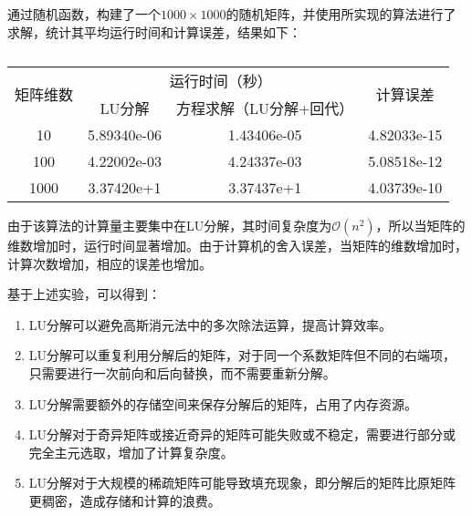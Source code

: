 \documentclass[12pt, onecolumn]{article}
\newcommand\normf{\fangsong}
\begin{document}
	\subsubsection{\normf{大型随机矩阵测试}}
	通过随机函数，构建了一个$1000\times 1000$的随机矩阵，并使用所实现的算法进行了求解，统计其平均运行时间和计算误差，结果如下：
	\begin{table}[h]
	\normf
	\centering
	\caption{\normf{测试结果}}
	\vspace{2mm}
	\begin{tabular}{c|ccc}
	\toprule
	\multirow{2}{*}{矩阵维数} & \multicolumn{2}{c}{运行时间（秒）} & \multirow{2}{*}{计算误差} \\ \cmidrule{2-3}
	                      & LU分解        & 方程求解（LU分解+回代） &                       \\ \midrule
	10                    & 5.89340e-06 & 1.43406e-05   & 4.82033e-15           \\
	100                   & 4.22002e-03 & 4.24337e-03   & 5.08518e-12           \\
	1000                  & 3.37420e+1  & 3.37437e+1    & 4.03739e-10           \\ \bottomrule
	\end{tabular}
	\end{table}
	
	由于该算法的计算量主要集中在LU分解，其时间复杂度为$\mathcal{O}(n^2)$，所以当矩阵的维数增加时，运行时间显著增加。由于计算机的舍入误差，当矩阵的维数增加时，计算次数增加，相应的误差也增加。
	
	基于上述实验，可以得到：
	\begin{enumerate}
	\item LU分解可以避免高斯消元法中的多次除法运算，提高计算效率。
	
	\item LU分解可以重复利用分解后的矩阵，对于同一个系数矩阵但不同的右端项，只需要进行一次前向和后向替换，而不需要重新分解。
	
	\item LU分解需要额外的存储空间来保存分解后的矩阵，占用了内存资源。
	
	\item LU分解对于奇异矩阵或接近奇异的矩阵可能失败或不稳定，需要进行部分或完全主元选取，增加了计算复杂度。
	
	\item LU分解对于大规模的稀疏矩阵可能导致填充现象，即分解后的矩阵比原矩阵更稠密，造成存储和计算的浪费。
	\end{enumerate}
	
\end{document}
